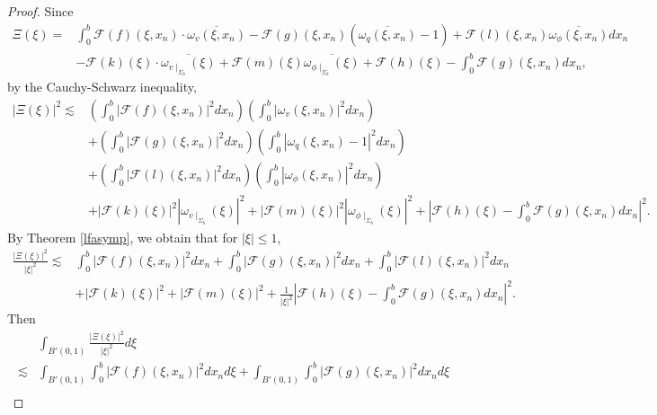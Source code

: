 \documentclass[11pt,letterpaper,reqno]{amsart}
\numberwithin{equation}{section}
\newcommand{\abs}[1]{\left\lvert#1\right\rvert}
\begin{document}
\begin{proof}
    Since
    \begin{align}
        \Xi(\xi)=&\int_{0}^{b}\mathcal{F}(f)(\xi,x_{n})\cdot \overline{\omega_{v}(\xi,x_{n})}-\mathcal{F}(g)(\xi,x_{n})(\overline{\omega_{q}(\xi,x_{n})}-1)+\mathcal{F}(l)(\xi,x_{n})\overline{\omega_{\phi}(\xi,x_{n})}dx_{n} \nonumber\\
        &-\mathcal{F}(k)(\xi)\cdot\overline{\omega_{v\mid_{\Sigma_{b}}}(\xi)}+\mathcal{F}(m)(\xi)\overline{\omega_{\phi\mid_{\Sigma_{b}}}(\xi)}+\mathcal{F}(h)(\xi)-\int_{0}^{b}\mathcal{F}(g)(\xi,x_{n})dx_{n},
    \end{align}
    by the Cauchy-Schwarz inequality,
    \begin{align}
        \abs{\Xi(\xi)}^{2} \lesssim&\left(\int_{0}^{b}\abs{\mathcal{F}(f)(\xi,x_{n})}^{2}dx_{n}\right)\left(\int_{0}^{b}\abs{\omega_{v}(\xi,x_{n})}^{2}dx_{n}\right) \nonumber\\
        &+\left(\int_{0}^{b}\abs{\mathcal{F}(g)(\xi,x_{n})}^{2}dx_{n}\right)\left(\int_{0}^{b}\abs{\omega_{q}(\xi,x_{n})-1}^{2}dx_{n}\right) \nonumber\\
        &+\left(\int_{0}^{b}\abs{\mathcal{F}(l)(\xi,x_{n})}^{2}dx_{n}\right)\left(\int_{0}^{b}\abs{\omega_{\phi}(\xi,x_{n})}^{2}dx_{n}\right) \nonumber\\
        &+\abs{\mathcal{F}(k)(\xi)}^{2}\abs{\omega_{v\mid_{\Sigma_{b}}}(\xi)}^{2} +\abs{\mathcal{F}(m)(\xi)}^{2}\abs{\omega_{\phi\mid_{\Sigma_{b}}}(\xi)}^{2}+\abs{\mathcal{F}(h)(\xi)-\int_{0}^{b}\mathcal{F}(g)(\xi,x_{n})dx_{n}}^{2}.
    \end{align}
    By Theorem \ref{lfasymp}, we obtain that for \(\abs{\xi} \leq 1\),
    \begin{align}
        \frac{\abs{\Xi(\xi)}^{2}}{\abs{\xi}^{2}} \lesssim &\int_{0}^{b}\abs{\mathcal{F}(f)(\xi,x_{n})}^{2}dx_{n}+\int_{0}^{b}\abs{\mathcal{F}(g)(\xi,x_{n})}^{2}dx_{n}+\int_{0}^{b}\abs{\mathcal{F}(l)(\xi,x_{n})}^{2}dx_{n} \nonumber \\
        &+\abs{\mathcal{F}(k)(\xi)}^{2}+\abs{\mathcal{F}(m)(\xi)}^{2}+\frac{1}{\abs{\xi}^{2}}\abs{\mathcal{F}(h)(\xi)-\int_{0}^{b}\mathcal{F}(g)(\xi,x_{n})dx_{n}}^{2}.
    \end{align}
    Then
    \begin{align}
        &\int_{B'(0,1)}\frac{\abs{\Xi(\xi)}^{2}}{\abs{\xi}^{2}}d\xi \nonumber\\
        \lesssim &\int_{B'(0,1)}\int_{0}^{b}\abs{\mathcal{F}(f)(\xi,x_{n})}^{2}dx_{n}d\xi+\int_{B'(0,1)}\int_{0}^{b}\abs{\mathcal{F}(g)(\xi,x_{n})}^{2}dx_{n}d\xi \nonumber\\

\end{align}
\end{proof}
\end{document}
